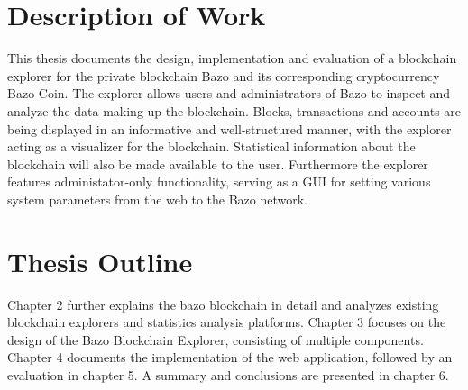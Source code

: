\section{Description of Work}
This thesis documents the design, implementation and evaluation of a blockchain explorer for the private blockchain Bazo and its corresponding cryptocurrency Bazo Coin. The explorer allows users and administrators of Bazo to inspect and analyze the data making up the blockchain. Blocks, transactions and accounts are being displayed in an informative and well-structured manner, with the explorer acting as a visualizer for the blockchain. Statistical information about the blockchain will also be made available to the user. Furthermore the explorer features administator-only functionality, serving as a GUI for setting various system parameters from the web to the Bazo network.

\section{Thesis Outline}
Chapter 2 further explains the bazo blockchain in detail and analyzes existing blockchain explorers and statistics analysis platforms. Chapter 3 focuses on the design of the Bazo Blockchain Explorer, consisting of multiple components. Chapter 4 documents the implementation of the web application, followed by an evaluation in chapter 5. A summary and conclusions are presented in chapter 6.